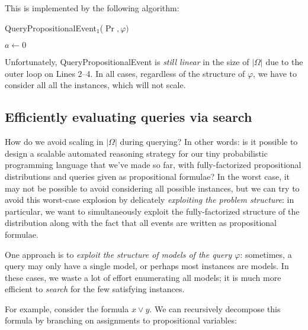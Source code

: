 \documentclass{tufte-handout}
\begin{document}
This is implemented by the following algorithm:

\begin{algorithm}
    \caption{QueryPropositionalEvent$_1$($\Pr, \varphi)$}
    $a \leftarrow 0$\;
    \label{alg:enum}
\end{algorithm}


Unfortunately, QueryPropositionalEvent is \emph{still linear} in the size of
$|\Omega|$ due to the outer loop on Lines 2--4.  In all cases, regardless of the
structure of $\varphi$, we have to consider all all the instances, which will
not scale.

\subsection{Efficiently evaluating queries via search}
How do we avoid scaling in $|\Omega|$ during querying? 
In other words: is it possible to design a scalable automated reasoning strategy 
for our tiny probabilistic programming language that we've made so far, with fully-factorized 
propositional distributions and queries given as propositional formulae?
In the worst case, it
may not be possible to avoid considering all possible instances, but we can 
try to avoid this worst-case explosion by delicately \emph{exploiting the problem 
structure}: in particular, we want to simultaneously exploit the fully-factorized 
structure of the distribution along with the fact that all events are written 
as propositional formulae.

One approach is to \emph{exploit the structure of models of the query
$\varphi$}: sometimes, a query may only have a single model, or perhaps most
instances are models. In these cases, we waste a lot of effort enumerating all
models; it is much more efficient to \emph{search} for the few satisfying instances.

For example, consider the formula $x \lor y$. We can recursively decompose this
formula by branching on assignments to propositional variables:

\end{document}
